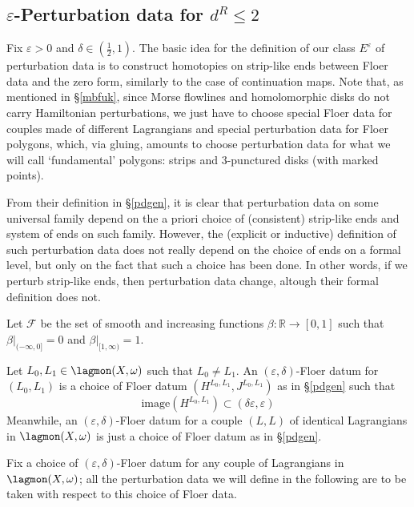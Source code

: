 	\subsection{$\varepsilon$-Perturbation data for $d^R\leq 2$}\label{d^R=2}
	Fix $\varepsilon>0$ and $\delta\in \left(\frac{1}{2},1\right)$. The basic idea for the definition of our class $E^\varepsilon$ of perturbation data is to construct homotopies on strip-like ends between Floer data and the zero form, similarly to the case of continuation maps. Note that, as mentioned in \S \ref{mbfuk}, since Morse flowlines and homolomorphic disks do not carry Hamiltonian perturbations, we just have to choose special Floer data for couples made of different Lagrangians and special perturbation data for Floer polygons, which, via gluing, amounts to choose perturbation data for what we will call `fundamental' polygons: strips and $3$-punctured disks (with marked points).
	\begin{rem}\label{remind}
		From their definition in \S \ref{pdgen}, it is clear that perturbation data on some universal family depend on the a priori choice of (consistent) strip-like ends and system of ends on such family. However, the (explicit or inductive) definition of such perturbation data does not really depend on the choice of ends on a formal level, but only on the fact that such a choice has been done. In other words, if we perturb strip-like ends, then perturbation data change, altough their formal definition does not. 
	\end{rem}
	
	Let $\mathcal{F}$ be the set of smooth and increasing functions $\beta: \mathbb{R}\to [0,1]$ such that $\beta\vert_{(-\infty,0]}=0$ and $\beta\vert_{[1,\infty)}=1$. \label{definitionofF}
	\begin{dfn}
		Let $L_0,L_1\in \lagmon(X,\omega)$ such that $L_0\neq L_1$. An $(\varepsilon,\delta)$-Floer datum for $(L_0,L_1)$ is a choice of Floer datum $(H^{L_0,L_1},J^{L_0,L_1})$ as in \S \ref{pdgen} such that $$\text{image}(H^{L_0,L_1})\subset \left(\delta\varepsilon,\varepsilon\right)$$
		Meanwhile, an $(\varepsilon,\delta)$-Floer datum for a couple $(L,L)$ of identical Lagrangians in $\lagmon(X,\omega)$ is just a choice of Floer datum as in \S \ref{pdgen}.
	\end{dfn}
	\noindent Fix a choice of $(\varepsilon,\delta)$-Floer datum for any couple of Lagrangians in $\lagmon(X,\omega)$; all the perturbation data we will define in the following are to be taken with respect to this choice of Floer data.\\
	
